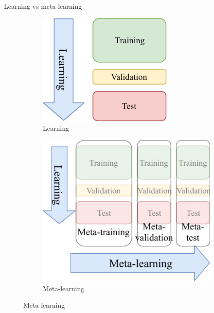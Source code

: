 \begin{frame}{Learning vs meta-learning}
\begin{figure}
	\begin{subfigure}[t]{0.48\linewidth}
		\includegraphics[width=0.8\linewidth]{learning.pdf}
		\caption{Learning}
	\end{subfigure}
	\begin{subfigure}[t]{0.48\linewidth}
		\includegraphics[width=0.8\linewidth]{meta_learning.pdf}
		\caption{Meta-learning}
	\end{subfigure}
\end{figure}
\end{frame}

